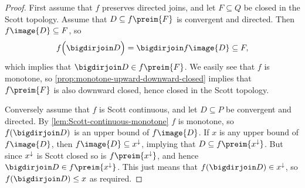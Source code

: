 \begin{proof}
    First
    assume that $f$ preserves directed joins, and let $F \subseteq Q$ be closed in the Scott topology. Assume that $D \subseteq f\preim{F}$ is convergent and directed. Then $f\image{D} \subseteq F$, so
    \begin{equation*}
        f \Bigl( \bigdirjoin D \Bigr)
            = \bigdirjoin f\image{D}
            \subseteq F,
    \end{equation*}
    which implies that $\bigdirjoin D \in f\preim{F}$. We easily see that $f$ is monotone, so \cref{prop:monotone-upward-downward-closed} implies that $f\preim{F}$ is also downward closed, hence closed in the Scott topology.

    Conversely assume that $f$ is Scott continuous, and let $D \subseteq P$ be convergent and directed. By \cref{lem:Scott-continuous-monotone} $f$ is monotone, so $f(\bigdirjoin D)$ is an upper bound of $f\image{D}$. If $x$ is any upper bound of $f\image{D}$, then $f\image{D} \subseteq \downset{x}$, implying that $D \subseteq f\preim{\downset{x}}$. But since $x^\downarrow$ is Scott closed so is $f\preim{\downset{x}}$, and hence $\bigdirjoin D \in f\preim{\downset{x}}$. This just means that $f(\bigdirjoin D) \in \downset{x}$, so $f(\bigdirjoin D) \leq x$ as required.
\end{proof}



